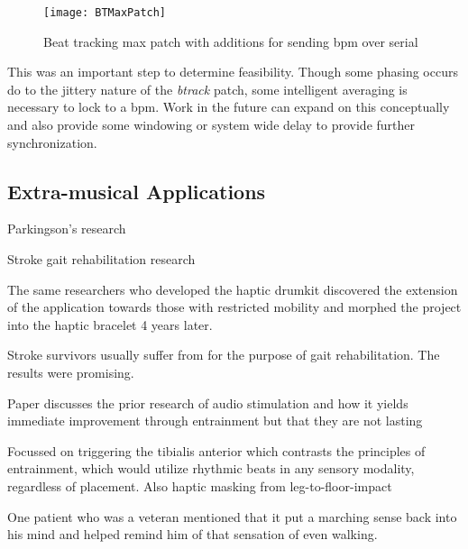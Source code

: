 \begin{figure}[H]
    \centering
    \texttt{[image: BTMaxPatch]}
    \caption{Beat tracking max patch with additions for sending bpm over serial}
    \label{fig:BTMaxPatch}
\end{figure}

This was an important step to determine feasibility. Though some phasing occurs do to the jittery nature of the \textit{btrack} patch, some intelligent averaging is necessary to lock to a bpm. Work in the future can expand on this conceptually and also provide some windowing or system wide delay to provide further synchronization.

\subsection{Extra-musical Applications}
Parkingson's research

Stroke gait rehabilitation research \cite{holland2014gait}

The same researchers who developed the haptic drumkit discovered the extension of the application towards those with restricted mobility and morphed the project into the haptic bracelet 4 years later.

Stroke survivors usually suffer from for the purpose of gait rehabilitation. The results were promising. 

Paper discusses the prior research of audio stimulation and how it yields immediate improvement through entrainment but that they are not lasting

Focussed on triggering the tibialis anterior which contrasts the principles of entrainment, which would utilize rhythmic beats in any sensory modality, regardless of placement. Also haptic masking from leg-to-floor-impact

One patient who was a veteran mentioned that it put a marching sense back into his mind and helped remind him of that sensation of even walking.